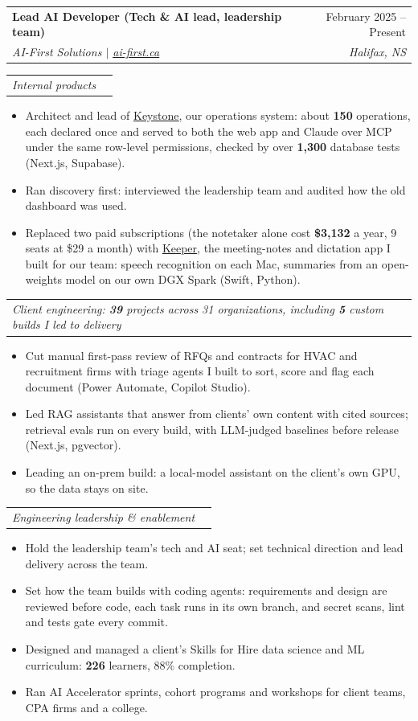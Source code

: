 \documentclass[letterpaper,11pt]{article}
\makeatletter
\newcommand{\resumeItem}[1]{
  \item\small{
    {#1 \vspace{-2pt}}
  }
}
\newcommand{\resumeSubheading}[4]{
  \vspace{-2pt}\item
    \begin{tabular*}{0.97\textwidth}[t]{l@{\extracolsep{\fill}}r}
      \textbf{#1} & #2 \\
      \textit{\small#3} & \textit{\small #4} \\
    \end{tabular*}\vspace{-7pt}
}
\newcommand{\resumeSubSubheading}[2]{
    \item
    \begin{tabular*}{0.97\textwidth}{l@{\extracolsep{\fill}}r}
      \textit{\small#1} & \textit{\small #2} \\
    \end{tabular*}\vspace{-7pt}
}
\newcommand{\resumeItemListStart}{\begin{itemize}}
\newcommand{\resumeItemListEnd}{\end{itemize}\vspace{-5pt}}
\makeatother
\begin{document}
    \resumeSubheading
      {Lead AI Developer \textmd{(Tech \& AI lead, leadership team)}}{February 2025 -- Present}
      {AI-First Solutions $|$ \emph{\href{https://www.ai-first.ca}{\underline{ai-first.ca}}}}{Halifax, NS}
    \resumeSubSubheading{Internal products}{}
      \resumeItemListStart
        \resumeItem{Architect and lead of \href{https://kakosyaneduard.ca/projects/keystone}{\underline{Keystone}}, our operations system: about \textbf{150} operations, each declared once and served to both the web app and Claude over MCP under the same row-level permissions, checked by over \textbf{1,300} database tests (Next.js, Supabase).}
        \resumeItem{Ran discovery first: interviewed the leadership team and audited how the old dashboard was used.}
        \resumeItem{Replaced two paid subscriptions (the notetaker alone cost \textbf{\$3,132} a year, 9 seats at \$29 a month) with \href{https://kakosyaneduard.ca/projects/keeper}{\underline{Keeper}}, the meeting-notes and dictation app I built for our team: speech recognition on each Mac, summaries from an open-weights model on our own DGX Spark (Swift, Python).}
      \resumeItemListEnd
    \resumeSubSubheading{Client engineering: \textbf{39} projects across 31 organizations, including \textbf{5} custom builds I led to delivery}{}
      \resumeItemListStart
        \resumeItem{Cut manual first-pass review of RFQs and contracts for HVAC and recruitment firms with triage agents I built to sort, score and flag each document (Power Automate, Copilot Studio).}
        \resumeItem{Led RAG assistants that answer from clients' own content with cited sources; retrieval evals run on every build, with LLM-judged baselines before release (Next.js, pgvector).}
        \resumeItem{Leading an on-prem build: a local-model assistant on the client's own GPU, so the data stays on site.}
      \resumeItemListEnd
    \resumeSubSubheading{Engineering leadership \& enablement}{}
      \resumeItemListStart
        \resumeItem{Hold the leadership team's tech and AI seat; set technical direction and lead delivery across the team.}
        \resumeItem{Set how the team builds with coding agents: requirements and design are reviewed before code, each task runs in its own branch, and secret scans, lint and tests gate every commit.}
        \resumeItem{Designed and managed a client's Skills for Hire data science and ML curriculum: \textbf{226} learners, 88\% completion.}
        \resumeItem{Ran AI Accelerator sprints, cohort programs and workshops for client teams, CPA firms and a college.}
      \resumeItemListEnd
\end{document}
